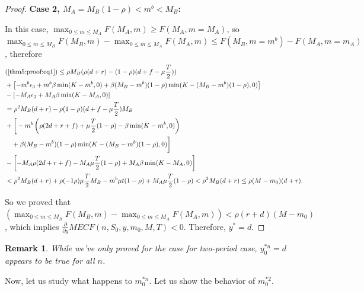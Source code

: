 \documentclass[11pt]{article}
\theoremstyle{plain}
\numberwithin{equation}{section}
\newtheorem{remk}{Remark}
\begin{document}
\begin{proof}
\noindent\textbf{Case 2, $ M_A=M_B(1-\rho)<m^{b}<M_B$:}

In this case, $\max_{0\leq m\leq M_A}F( M_A,m)\geq F(M_A,m=M_A)$, so
$\max_{0\leq m\leq M_B}F( M_B,m)- \max_{0\leq m\leq M_A}F( M_A,m) \leq 
F(M_B,m=m^b)-F(M_A,m=m_A)$, therefore
%
%
\begin{align*}
	&(\ref{thm5:proof:eq1})\leq \rho M_B (\rho (d+r)-(1-\rho) (d+f-\mu{\frac{T}{2}}))\\
	&+ \left[
	-m^{b}\epsilon_3 +m^{b}\beta \min (K-m^{b},0)+\beta (M_B-m^{b})(1-\rho) \min(K-(M_B-m^{b})(1-\rho),0)
	\right]
	\\
	&- \left[
	-M_A\epsilon_3 +M_A\beta \min (K-M_A,0)
	\right]\\
&= \rho^2 M_B(d+r) - \rho (1-\rho) (d+f-\mu {\frac{T}{2}}) M_B\\
&+ \bigg[
	-m^{b}\left( \rho(2d+r+f) + \mu {\frac{T}{2}} (1-\rho) -\beta \min (K-m^{b},0) \right)\\
	 &\quad +\beta (M_B-m^{b})(1-\rho) \min(K-(M_B-m^{b})(1-\rho),0)
	\bigg]
	\\
	&- \left[-M_A\rho(2d+r+f) -M_A \mu {\frac{T}{2}} (1-\rho) +M_A\beta \min (K-M_A,0)
	\right]\\
	&<\rho^2 M_B(d+r)+\rho(-1\rho)\mu {\frac{T}{2}} M_B -m^{b} \mu t (1-\rho) +M_A\mu {\frac{T}{2}}(1-\rho)<\rho^2 M_B(d+r)\leq \rho (M-m_0)(d+r). 
\end{align*}

So we proved that  $\left(\max_{0\leq m\leq M_B}F( M_B,m)- \max_{0\leq m\leq M_A}F( M_A,m)\right)<\rho(r+d)(M-m_0)$, which implies  $\frac{\partial }{\partial y} MECF (n, S_0,y, m_0,M,T)<0$. Therefore,  $y^*=d$. 


\end{proof}


\begin{remk}
While we've only proved for the case for two-period case, $y_0^{*n}=d$ appears to be true for all $n$. 
\end{remk}


Now, let us study what happens to $m_{0}^{*n}$. Let us show the behavior of $m_0^{*2}$. 
\end{document}
